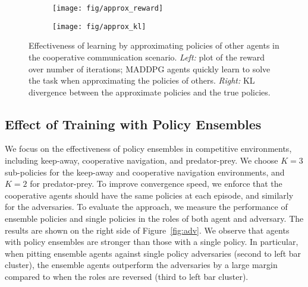 \documentclass{article}
\newcommand{\cpol}[0]{\pmb{\mu}}
\begin{document}
\begin{figure}
\begin{subfigure}{.5\textwidth}
  \centering
  \texttt{[image: fig/approx\_reward]}
  \label{fig:approx_reward}
\end{subfigure}
\begin{subfigure}{.5\textwidth}
  \centering
  \texttt{[image: fig/approx\_kl]}
  \label{fig:approx_kl}
\end{subfigure}
\caption{Effectiveness of learning by approximating policies of other agents in the cooperative communication scenario. \textit{Left:} plot of the reward over number of iterations; MADDPG agents quickly learn to solve the task when approximating the policies of others. \textit{Right:} KL divergence between the approximate policies and the true policies. \vspace{-3mm}}\label{fig:approx}
\end{figure}



\subsection{Effect of Training with Policy Ensembles}
We focus on the effectiveness of policy ensembles in competitive environments, including keep-away, cooperative navigation, and predator-prey. We choose $K=3$ sub-policies for the keep-away and cooperative navigation environments, and $K=2$ for predator-prey. To improve convergence speed, we enforce that the cooperative agents should have the same policies at each episode, and similarly for the adversaries.
To evaluate the approach, we measure the performance of ensemble policies and single policies in the roles of both agent and adversary. %
The results are shown on the right side of Figure~\ref{fig:adv}. We observe that agents with policy ensembles are stronger than those with a single policy. In particular, when pitting ensemble agents against single policy adversaries (second to left bar cluster), the ensemble agents outperform the adversaries by a large margin compared to when the roles are reversed (third to left bar cluster).
\end{document}
